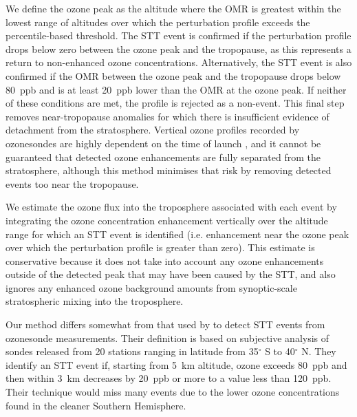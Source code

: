 \documentclass[acp, manuscript]{copernicus} %
\begin{document}
    We define the ozone peak as the altitude where the OMR is greatest within the lowest range of altitudes over which the perturbation profile exceeds the percentile-based threshold.
    The STT event is confirmed if the perturbation profile drops below zero between the ozone peak and the tropopause, as this represents a return to non-enhanced ozone concentrations.
    Alternatively, the STT event is also confirmed if the OMR between the ozone peak and the tropopause drops below 80~ppb and is at least 20~ppb lower than the OMR at the ozone peak. 
    If neither of these conditions are met, the profile is rejected as a non-event.
    This final step removes near-tropopause anomalies for which there is insufficient evidence of detachment from the stratosphere.
    Vertical ozone profiles recorded by ozonesondes are highly dependent on the time of launch \citep{Sprenger2003}, and it cannot be guaranteed that detected ozone enhancements are fully separated from the stratosphere, although this method minimises that risk by removing detected events too near the tropopause.

    We estimate the ozone flux into the troposphere associated with each event by integrating the ozone concentration enhancement vertically over the altitude range for which an STT event is identified (i.e. enhancement near the ozone peak over which the perturbation profile is greater than zero).
    This estimate is conservative because it does not take into account any ozone enhancements outside of the detected peak that may have been caused by the STT, and also ignores any enhanced ozone background amounts from synoptic-scale stratospheric mixing into the troposphere.
    
    Our method differs somewhat from that used by \citet{Tang2010} to detect STT events from ozonesonde measurements. 
    Their definition is based on subjective analysis of sondes released from 20 stations ranging in latitude from 35$^\circ$ S to 40$^\circ$ N.
    They identify an STT event if, starting from 5~km altitude, ozone exceeds 80~ppb and then within 3~km decreases by 20~ppb or more to a value less than 120~ppb.
    Their technique would miss many events due to the lower ozone concentrations found in the cleaner Southern Hemisphere.
\end{document}
